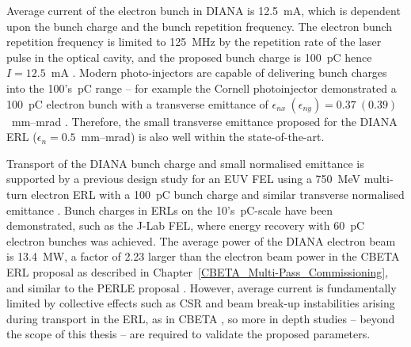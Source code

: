 \documentclass[../main.tex]{subfiles}
\begin{document}
Average current of the electron bunch in DIANA is 12.5~\si{\milli\ampere}, which is dependent upon the bunch charge and the bunch repetition frequency. The electron bunch repetition frequency is limited to 125~\si{\mega\hertz} by the repetition rate of the laser pulse in the optical cavity, and the proposed bunch charge is 100~\si{\pico\coulomb} hence $I=12.5$~\si{\milli\ampere} . Modern photo-injectors are capable of delivering bunch charges into the 100's~\si{\pico\coulomb} range \cite{angal2018perle,hounsell2021optimization} -- for example the Cornell photoinjector demonstrated a 100~\si{\pico\coulomb} electron bunch with a transverse emittance of $\epsilon_{nx}~\left(\epsilon_{ny}\right) = 0.37~ (0.39)$~\si{\milli\meter}--\si{\milli\radian} \cite{bartnik2015operational}. Therefore, the small transverse emittance proposed for the DIANA ERL ($\epsilon_{n}=0.5$~\si{\milli\meter}--\si{\milli\radian}) is also well within the state-of-the-art.

Transport of the DIANA bunch charge and small normalised emittance is supported by a previous design study for an EUV FEL using a 750~\si{\mega\electronvolt} multi-turn electron ERL with a 100~\si{\pico\coulomb} bunch charge and similar transverse normalised emittance \cite{akkermans2017compact}. Bunch charges in ERLs on the 10's~\si{\pico\coulomb}-scale have been demonstrated, such as the J-Lab FEL, where energy recovery with 60~\si{\pico\coulomb} electron bunches \cite{benson1999first} was achieved. The average power of the DIANA electron beam is 13.4~\si{\mega\watt}, a factor of 2.23 larger than the electron beam power in the CBETA ERL proposal as described in Chapter~\ref{CBETA_Multi-Pass_Commissioning}, and similar to the PERLE proposal \cite{angal2018perle}. However, average current is fundamentally limited by collective effects such as CSR and beam break-up instabilities arising during transport in the ERL, as in CBETA \cite{lou2019beam,lou2020coherent}, so more in depth studies -- beyond the scope of this thesis -- are required to validate the proposed parameters. 
\end{document}
